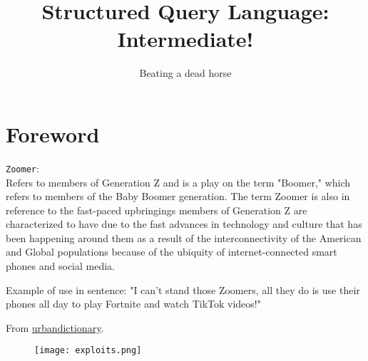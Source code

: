 \documentclass{42-en}
\begin{document}
                           \title{Structured Query Language: Intermediate!}
                          \subtitle{Beating a dead horse}


\maketitle

\tableofcontents


\chapter{Foreword}

\texttt{Zoomer}: \\
Refers to members of Generation Z and is a play on the term "Boomer," which refers to members of the Baby Boomer generation. The term Zoomer is also in reference to the fast-paced upbringings members of Generation Z are characterized to have due to the fast advances in technology and culture that has been happening around them as a result of the interconnectivity of the American and Global populations because of the ubiquity of internet-connected smart phones and social media.

Example of use in sentence: "I can't stand those Zoomers, all they do is use their phones all day to play Fortnite and watch TikTok videos!"

From \href{https://www.urbandictionary.com/define.php?term=Zoomer}{urbandictionary}.
    
            \begin{figure}[H]
                \begin{center}
                    \texttt{[image: exploits.png]}
                \end{center}
            \end{figure}
\end{document}
